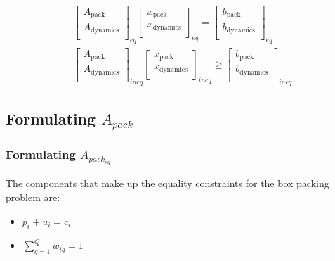 \documentclass[letterpaper, 10pt, conference]{IEEEtran}
\begin{document}
\begin{subequations}
\begin{align}
    \begin{bmatrix}
        A_{\textrm{pack}}     \\
        A_{\textrm{dynamics}} \\
    \end{bmatrix}_{eq}
    \begin{bmatrix}
        x_{\textrm{pack}}     \\
        x_{\textrm{dynamics}} \\
    \end{bmatrix}_{eq} =
    \begin{bmatrix}
        b_{\textrm{pack}}     \\
        b_{\textrm{dynamics}} \\
    \end{bmatrix}_{eq} \\
    \begin{bmatrix}
        A_{\textrm{pack}}     \\
        A_{\textrm{dynamics}} \\
    \end{bmatrix}_{ineq}
    \begin{bmatrix}
        x_{\textrm{pack}}     \\
        x_{\textrm{dynamics}} \\
    \end{bmatrix}_{ineq} \geq
    \begin{bmatrix}
        b_{\textrm{pack}}     \\
        b_{\textrm{dynamics}} \\
    \end{bmatrix}_{ineq}
\end{align}
\end{subequations}

\subsection{Formulating $A_{pack}$}

\subsubsection{Formulating $A_{pack_{eq}}$}

The components that make up the equality constraints for the box packing
problem are:

\begin{itemize}
\item
  \(p_i + u_i = c_i\)
\item
  \(\sum_{q=1}^Q w_{iq} = 1\)
\end{itemize}
\end{document}
